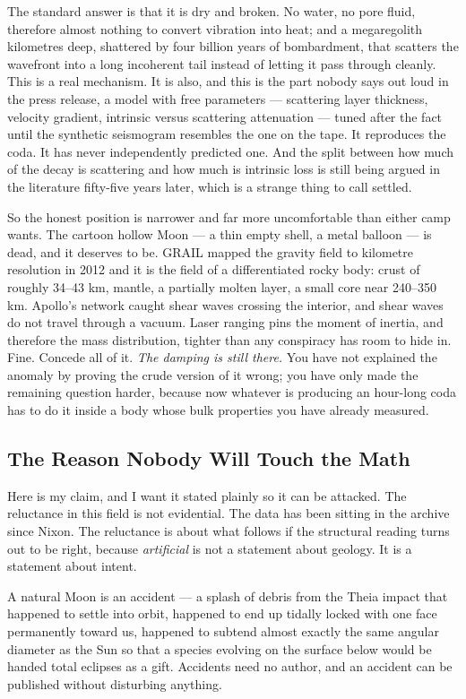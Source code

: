 The standard answer is that it is dry and broken. No water, no pore fluid, therefore almost nothing
to convert vibration into heat; and a megaregolith kilometres deep, shattered by four billion years
of bombardment, that scatters the wavefront into a long incoherent tail instead of letting it pass
through cleanly. This is a real mechanism. It is also, and this is the part nobody says out loud in
the press release, a model with free parameters --- scattering layer thickness, velocity gradient,
intrinsic versus scattering attenuation --- tuned after the fact until the synthetic seismogram
resembles the one on the tape. It reproduces the coda. It has never independently predicted one.
And the split between how much of the decay is scattering and how much is intrinsic loss is still
being argued in the literature fifty-five years later, which is a strange thing to call settled.

So the honest position is narrower and far more uncomfortable than either camp wants. The cartoon
hollow Moon --- a thin empty shell, a metal balloon --- is dead, and it deserves to be. GRAIL mapped
the gravity field to kilometre resolution in 2012 and it is the field of a differentiated rocky
body: crust of roughly 34--43 km, mantle, a partially molten layer, a small core near 240--350 km.
Apollo's network caught shear waves crossing the interior, and shear waves do not travel through a
vacuum. Laser ranging pins the moment of inertia, and therefore the mass distribution, tighter than
any conspiracy has room to hide in. Fine. Concede all of it. \emph{The damping is still there.} You
have not explained the anomaly by proving the crude version of it wrong; you have only made the
remaining question harder, because now whatever is producing an hour-long coda has to do it inside a
body whose bulk properties you have already measured.

\subsection{The Reason Nobody Will Touch the Math}\label{sec:whynobodytouches}

Here is my claim, and I want it stated plainly so it can be attacked. The reluctance in this field
is not evidential. The data has been sitting in the archive since Nixon. The reluctance is about
what follows if the structural reading turns out to be right, because \emph{artificial} is not a
statement about geology. It is a statement about intent.

A natural Moon is an accident --- a splash of debris from the Theia impact that happened to settle
into orbit, happened to end up tidally locked with one face permanently toward us, happened to
subtend almost exactly the same angular diameter as the Sun so that a species evolving on the
surface below would be handed total eclipses as a gift. Accidents need no author, and an accident
can be published without disturbing anything.

